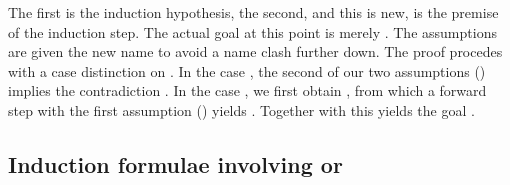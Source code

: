 \begin{isabellebody}
\begin{isamarkuptext}
The first is the induction hypothesis, the second, and this is new,
is the premise of the induction step. The actual goal at this point is merely
. The assumptions are given the new name
 to avoid a name clash further down. The proof procedes with a case distinction on . In the case , the second of our two
assumptions () implies the contradiction .
 In the case , we first obtain
, from which a forward step with the first assumption () yields . Together
with  this yields the goal
.


\subsection{Induction formulae involving  or }


\end{isamarkuptext}
\end{isabellebody}
